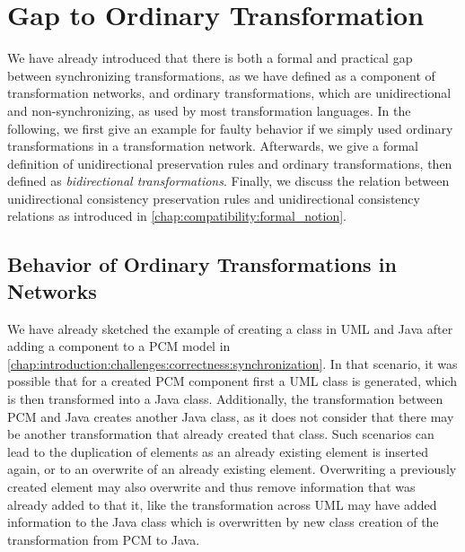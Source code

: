 \section{Gap to Ordinary Transformation}

We have already introduced that there is both a formal and practical gap between synchronizing transformations, as we have defined as a component of transformation networks, and ordinary transformations, which are unidirectional and non-synchronizing, as used by most transformation languages.
In the following, we first give an example for faulty behavior if we simply used ordinary transformations in a transformation network.
Afterwards, we give a formal definition of unidirectional preservation rules and ordinary transformations, then defined as \emph{bidirectional transformations}.
Finally, we discuss the relation between unidirectional consistency preservation rules and unidirectional consistency relations as introduced in \autoref{chap:compatibility:formal_notion}.


\subsection{Behavior of Ordinary Transformations in Networks}
We have already sketched the example of creating a class in UML and Java after adding a component to a \gls{PCM} model in \autoref{chap:introduction:challenges:correctness:synchronization}.
In that scenario, it was possible that for a created \gls{PCM} component first a UML class is generated, which is then transformed into a Java class.
Additionally, the transformation between \gls{PCM} and Java creates another Java class, as it does not consider that there may be another transformation that already created that class.
Such scenarios can lead to the duplication of elements as an already existing element is inserted again, or to an overwrite of an already existing element.
Overwriting a previously created element may also overwrite and thus remove information that was already added to that it, like the transformation across UML may have added information to the Java class which is overwritten by new class creation of the transformation from PCM to Java.

